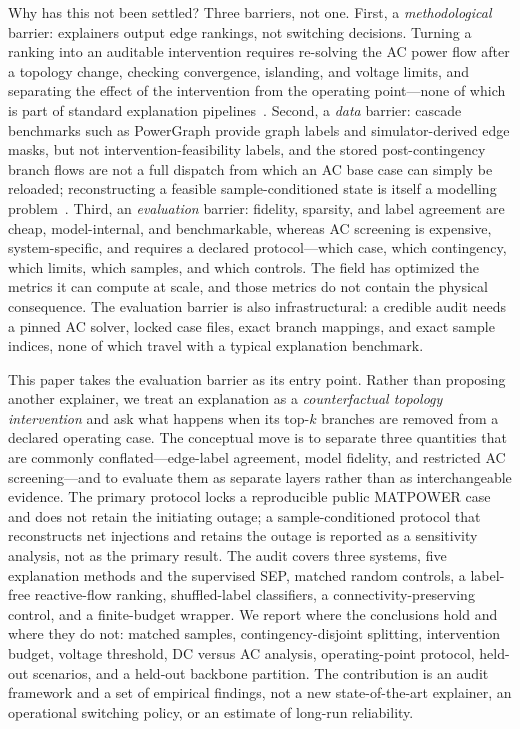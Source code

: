 Why has this not been settled? Three barriers, not one. First, a \emph{methodological} barrier: explainers output edge rankings, not switching decisions. Turning a ranking into an auditable intervention requires re-solving the AC power flow after a topology change, checking convergence, islanding, and voltage limits, and separating the effect of the intervention from the operating point---none of which is part of standard explanation pipelines~\citep{ying2019,luo2020,yuan2021,miao2022}. Second, a \emph{data} barrier: cascade benchmarks such as PowerGraph provide graph labels and simulator-derived edge masks, but not intervention-feasibility labels, and the stored post-contingency branch flows are not a full dispatch from which an AC base case can simply be reloaded; reconstructing a feasible sample-conditioned state is itself a modelling problem~\citep{guo2023,varbella2024}. Third, an \emph{evaluation} barrier: fidelity, sparsity, and label agreement are cheap, model-internal, and benchmarkable, whereas AC screening is expensive, system-specific, and requires a declared protocol---which case, which contingency, which limits, which samples, and which controls. The field has optimized the metrics it can compute at scale, and those metrics do not contain the physical consequence. The evaluation barrier is also infrastructural: a credible audit needs a pinned AC solver, locked case files, exact branch mappings, and exact sample indices, none of which travel with a typical explanation benchmark.

This paper takes the evaluation barrier as its entry point. Rather than proposing another explainer, we treat an explanation as a \emph{counterfactual topology intervention} and ask what happens when its top-$k$ branches are removed from a declared operating case. The conceptual move is to separate three quantities that are commonly conflated---edge-label agreement, model fidelity, and restricted AC screening---and to evaluate them as separate layers rather than as interchangeable evidence. The primary protocol locks a reproducible public MATPOWER case and does not retain the initiating outage; a sample-conditioned protocol that reconstructs net injections and retains the outage is reported as a sensitivity analysis, not as the primary result. The audit covers three systems, five explanation methods and the supervised SEP, matched random controls, a label-free reactive-flow ranking, shuffled-label classifiers, a connectivity-preserving control, and a finite-budget wrapper. We report where the conclusions hold and where they do not: matched samples, contingency-disjoint splitting, intervention budget, voltage threshold, DC versus AC analysis, operating-point protocol, held-out scenarios, and a held-out backbone partition. The contribution is an audit framework and a set of empirical findings, not a new state-of-the-art explainer, an operational switching policy, or an estimate of long-run reliability.

